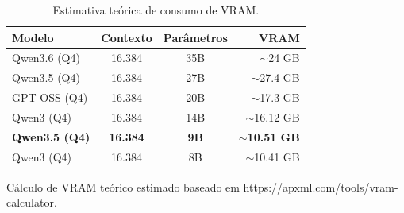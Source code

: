 \documentclass[12pt]{article}
\begin{document}
\begin{table}[H]
  \centering
  \begin{threeparttable}
  \caption{Estimativa teórica de consumo de VRAM.}
  \label{tab:latency_compatibility}
  \footnotesize
  \begin{tabular}{l c c r}
    \toprule
    \textbf{Modelo}       & \textbf{Contexto} & \textbf{Parâmetros} & \textbf{VRAM}           \\
    \midrule
    Qwen3.6 (Q4)          & 16.384            & 35B                 & $\sim$24 GB             \\
    Qwen3.5 (Q4)          & 16.384            & 27B                 & $\sim$27.4 GB           \\
    GPT-OSS (Q4)          & 16.384            & 20B                 & $\sim$17.3 GB           \\
    Qwen3 (Q4)            & 16.384            & 14B                 & $\sim$16.12 GB          \\
    \textbf{Qwen3.5 (Q4)} & \textbf{16.384}   & \textbf{9B}         & \textbf{$\sim$10.51 GB} \\
    Qwen3 (Q4)            & 16.384            & 8B                  & $\sim$10.41 GB          \\
    \bottomrule
  \end{tabular}
  \begin{tablenotes}
    \footnotesize
    \item[*] Cálculo de VRAM teórico estimado baseado em https://apxml.com/tools/vram-calculator.
  \end{tablenotes}
  \end{threeparttable}
\end{table}



\end{document}
